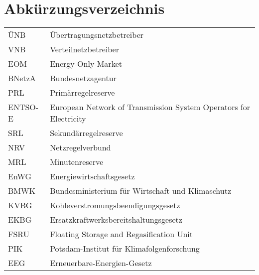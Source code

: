 \section*{Abkürzungsverzeichnis}
%
%	
	\begin{tabulary}{\textwidth}{lL}
		ÜNB & Übertragungsnetzbetreiber \\
		VNB & Verteilnetzbetreiber \\
		EOM & Energy-Only-Market \\
		BNetzA & Bundesnetzagentur \\
		PRL & Primärregelreserve \\
		ENTSO-E & European Network of Transmission System Operators for Electricity \\
		SRL & Sekundärregelreserve \\
		NRV & Netzregelverbund \\
		MRL & Minutenreserve \\
		EnWG & Energiewirtschaftsgesetz \\
		BMWK & Bundesministerium für Wirtschaft und Klimaschutz	\\
		KVBG & Kohleverstromungsbeendigungsgesetz \\
		EKBG & Ersatzkraftwerksbereitshaltungsgesetz \\
		FSRU & Floating Storage and Regasification Unit \\
		PIK & Potsdam-Institut für Klimafolgenforschung \\
		EEG & Erneuerbare-Energien-Gesetz
	\end{tabulary} \clearpage

	
